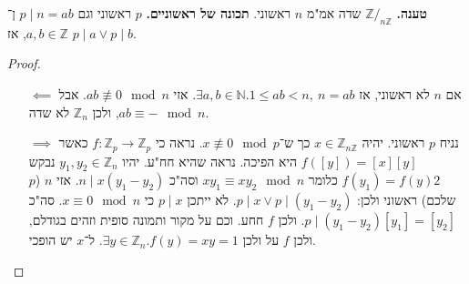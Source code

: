 \documentclass[]{article}
\newcommand\N     {\mathbb{N}}
\newcommand\Z     {\mathbb{Z}}
\begin{document}
	\textbf{טענה. }$\Z/_{n\Z}$ שדה אמ"מ $n$ ראשוני. 
	\textbf{תכונה של ראשוניים. }$p$ ראשוני וגם $p \mid n = ab$ ן־$a, b \in \Z$, אז $p \mid a \lor p \mid b$. 
	\begin{proof}
		\begin{enumerate}
			\item[$\impliedby$] אם $n$ לא ראשוני, אז $\exists a, b \in \N. 1 \le ab < n, \ n = ab$. אזי $ab \not\equiv 0 \mod n$. אבל $ab \equiv - \mod n$, ולכן $\Z_n$ לא שדה. 
			\item[$\implies$]נניח $p$ ראשוני. יהיה $x \in \Z_{n\Z}$ כך ש־$x \not\equiv 0 \mod p$. נראה כי $f \colon \Z_p \to \Z_p$ כאשר $f([y]) = [x][y]$ היא הפיכה. נראה שהיא חח"ע. יהיו $y_1, y_2 \in \Z_n$ נבקש $f(y_1) = f(y)2$ כלומר $xy_1 \equiv xy_2 \mod n$ וסה"כ $n \mid x(y_1 - y_2)$. אזי $n$ ($p$ שלכם) ראשוני ולכן: 
			$p \mid x \lor p \mid (y_1 - y_2)$. לא ייתכן $p \mid x$ כי $x \equiv 0 \mod n$. סה"כ $p \mid (y_1 - y_2)[y_1] = [y_2]$. ולכן $f$ חחע. וכם על מקור ותמונה סופית וזהים בגודלם, ולכן $f$ על ולכן $\exists y \in \Z_n. f(y) = xy = 1$. ל־$x$ יש הופכי. 
		\end{enumerate}
	\end{proof}
	
\end{document}
